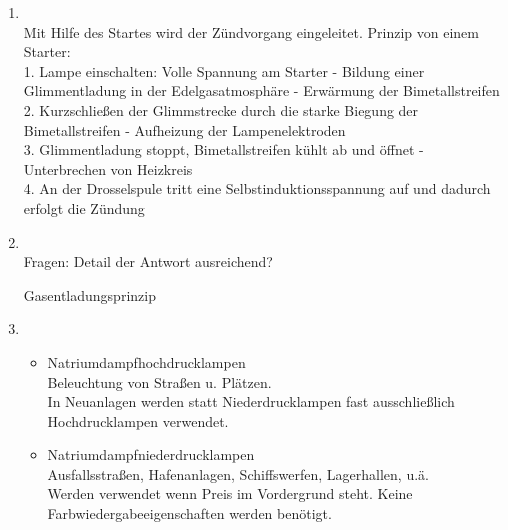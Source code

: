 \begin{enumerate}
    \item   {}\\
    
    Mit Hilfe des Startes wird der Zündvorgang eingeleitet. Prinzip von einem Starter:
    \\1.    Lampe einschalten: Volle Spannung am Starter - Bildung einer Glimmentladung in der Edelgasatmosphäre - Erwärmung der Bimetallstreifen
    \\2.    Kurzschließen der Glimmstrecke durch die starke Biegung der Bimetallstreifen - Aufheizung der Lampenelektroden
    \\3.    Glimmentladung stoppt, Bimetallstreifen kühlt ab und öffnet - Unterbrechen von Heizkreis
    \\4.    An der Drosselspule tritt eine Selbstinduktionsspannung auf und dadurch erfolgt die Zündung

    \item   {}\\
    
            Fragen: Detail der Antwort ausreichend?        

            Gasentladungsprinzip

            \clearpage
            
    \item   {}\\
    
            \begin{itemize}
                \item Natriumdampfhochdrucklampen\\
                    Beleuchtung von Straßen u. Plätzen. \\
                    In Neuanlagen werden statt Niederdrucklampen fast ausschließlich Hochdrucklampen verwendet.

                \item Natriumdampfniederdrucklampen\\
                    Ausfallsstraßen, Hafenanlagen, Schiffswerfen, Lagerhallen, u.ä.\\
                    Werden verwendet wenn Preis im Vordergrund steht. Keine Farbwiedergabeeigenschaften werden benötigt.


\end{itemize}
\end{enumerate}
